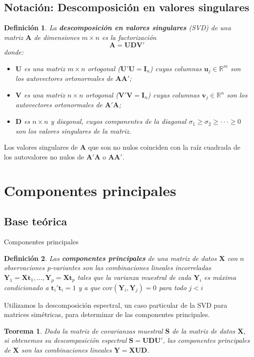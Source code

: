 \documentclass{beamer}
\newtheorem{defi}{Definición}[section]
\newtheorem{teor}{Teorema}[section]
\begin{document}
\subsection{Notación: Descomposición en valores singulares}
\begin{frame}{}
\begin{defi}
La \textbf{descomposición en valores singulares} (SVD) de una matriz $\mathbf{A}$ de dimensiones $m \times n$ es la factorización
$$\mathbf{A}=\mathbf{UDV}'$$ 
donde:
\begin{itemize}
    \item $\mathbf{U}$ es una matriz $m \times n$ ortogonal ($\mathbf{U}'\mathbf{U}=\mathbf{I}_n$) cuyas columnas $\mathbf{u}_j \in \mathbb{R}^m$ son los autovectores ortonormales de $\mathbf{AA'}$;
    \item $\mathbf{V}$ es una matriz $n \times n$ ortogonal ($\mathbf{V}'\mathbf{V}=\mathbf{I}_n$) cuyas columnas $\mathbf{v}_j \in \mathbb{R}^n$ son los autovectores ortonormales de $\mathbf{A'A}$;
    \item $\mathbf{D}$ es $n \times n$ y diagonal, cuyos componentes de la diagonal $\sigma_1 \geq \sigma_2 \geq \cdot \cdot \cdot \geq 0$ son los valores singulares de la matriz.
\end{itemize}
\end{defi}

Los valores singulares de $\mathbf{A}$ que son no nulos coinciden con la raíz cuadrada de los autovalores no nulos de $\mathbf{A'A}$ o $\mathbf{AA'}$.
\end{frame}

\section{Componentes principales}
\subsection{Base teórica}
\begin{frame}{Componentes principales}
\begin{defi}
    Las \textbf{componentes principales} de una matriz de datos $\mathbf{X}$ con $n$ observaciones p-variantes son las combinaciones lineales incorreladas $\mathbf{Y}_1 = \mathbf{Xt}_1, \ldots, \mathbf{Y}_p = \mathbf{Xt}_p$
    tales que la varianza muestral de cada $\mathbf{Y}_i$ es máxima condicionado a $\mathbf{t}_i'\mathbf{t}_i = 1$ y a que $\mbox{cov}(\mathbf{Y}_i, \mathbf{Y}_j) = 0$ para todo $j < i$
\end{defi}

Utilizamos la descomposición espectral, un caso particular de la SVD para matrices simétricas, para determinar de las componentes principales.
\begin{teor}
    Dada la matriz de covarianzas muestral $\mathbf{S}$ de la matriz de datos $\mathbf{X}$, si obtenemos su descomposición espectral $\mathbf{S = UDU'}$, las componentes principales de $\mathbf{X}$ son las combinaciones lineales $\mathbf{Y} = \mathbf{XUD}$.
\end{teor}
    
\end{frame}
\end{document}
